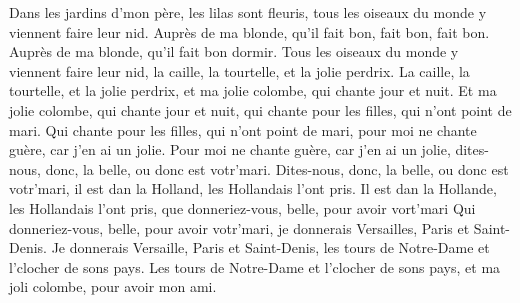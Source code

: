 \beginverse
Dans les jardins d'mon père, les lilas sont fleuris, tous les oiseaux du monde y viennent faire leur nid.
\endverse
\beginchorus
Auprès de ma blonde, qu'il fait bon, fait bon, fait bon.
Auprès de ma blonde, qu'il fait bon dormir.
\endchorus
\beginverse
Tous les oiseaux du monde y viennent faire leur nid, la caille, la tourtelle, et la jolie perdrix.
\endverse
\beginverse
La caille, la tourtelle, et la jolie perdrix, et ma jolie colombe, qui chante jour et nuit.
\endverse
\beginverse
Et ma jolie colombe, qui chante jour et nuit, qui chante pour les filles, qui n’ont point de mari.
\endverse
\beginverse
Qui chante pour les filles, qui n’ont point de mari, pour moi ne chante guère, car j’en ai un jolie.
\endverse
\beginverse
Pour moi ne chante guère, car j’en ai un jolie, dites-nous, donc, la belle, ou donc est votr’mari.
\endverse
\beginverse
Dites-nous, donc, la belle, ou donc est votr’mari, il est dan la Holland, les Hollandais l’ont pris.
\endverse
\beginverse
Il est dan la Hollande, les Hollandais l’ont pris, que donneriez-vous, belle, pour avoir vort’mari
\endverse
\beginverse
Qui donneriez-vous, belle, pour avoir votr’mari, je donnerais Versailles, Paris et Saint-Denis.
\endverse
\beginverse
Je donnerais Versaille, Paris et Saint-Denis, les tours de Notre-Dame et l’clocher de sons pays.
\endverse
\beginverse
Les tours de Notre-Dame et l’clocher de sons pays, et ma joli colombe, pour avoir mon ami.
\endverse
\endsong